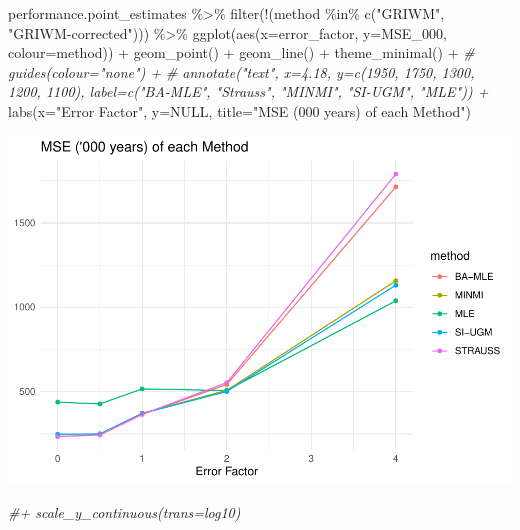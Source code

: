 \documentclass[
]{article}
\newenvironment{Shaded}{\begin{snugshade}}{\end{snugshade}}
\newcommand{\AttributeTok}[1]{\textcolor[rgb]{0.77,0.63,0.00}{#1}}
\newcommand{\CommentTok}[1]{\textcolor[rgb]{0.56,0.35,0.01}{\textit{#1}}}
\newcommand{\ConstantTok}[1]{\textcolor[rgb]{0.00,0.00,0.00}{#1}}
\newcommand{\FunctionTok}[1]{\textcolor[rgb]{0.00,0.00,0.00}{#1}}
\newcommand{\NormalTok}[1]{#1}
\newcommand{\SpecialCharTok}[1]{\textcolor[rgb]{0.00,0.00,0.00}{#1}}
\newcommand{\StringTok}[1]{\textcolor[rgb]{0.31,0.60,0.02}{#1}}
\begin{document}
\begin{Shaded}
\begin{Highlighting}[]
\NormalTok{performance.point\_estimates }\SpecialCharTok{\%\textgreater{}\%}
  \FunctionTok{filter}\NormalTok{(}\SpecialCharTok{!}\NormalTok{(method }\SpecialCharTok{\%in\%} \FunctionTok{c}\NormalTok{(}\StringTok{"GRIWM"}\NormalTok{, }\StringTok{"GRIWM{-}corrected"}\NormalTok{))) }\SpecialCharTok{\%\textgreater{}\%}
  \FunctionTok{ggplot}\NormalTok{(}\FunctionTok{aes}\NormalTok{(}\AttributeTok{x=}\NormalTok{error\_factor, }\AttributeTok{y=}\NormalTok{MSE\_000, }\AttributeTok{colour=}\NormalTok{method)) }\SpecialCharTok{+}
  \FunctionTok{geom\_point}\NormalTok{() }\SpecialCharTok{+}
  \FunctionTok{geom\_line}\NormalTok{() }\SpecialCharTok{+}
  \FunctionTok{theme\_minimal}\NormalTok{() }\SpecialCharTok{+}
  \CommentTok{\# guides(colour="none") +}
  \CommentTok{\# annotate("text", x=4.18, y=c(1950, 1750, 1300, 1200, 1100), label=c("BA{-}MLE", "Strauss", "MINMI", "SI{-}UGM", "MLE")) +}
  \FunctionTok{labs}\NormalTok{(}\AttributeTok{x=}\StringTok{"Error Factor"}\NormalTok{, }\AttributeTok{y=}\ConstantTok{NULL}\NormalTok{, }\AttributeTok{title=}\StringTok{"MSE (\textquotesingle{}000 years) of each Method"}\NormalTok{)}
\end{Highlighting}
\end{Shaded}

\includegraphics{sim_exp-results_files/figure-latex/unnamed-chunk-4-1.pdf}

\begin{Shaded}
\begin{Highlighting}[]
  \CommentTok{\#+  scale\_y\_continuous(trans=\textquotesingle{}log10\textquotesingle{})}
\end{Highlighting}
\end{Shaded}
\end{document}
